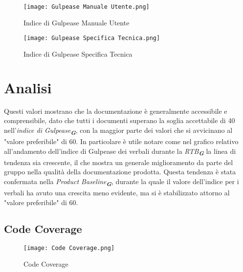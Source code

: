 \begin{figure}[H]
    \centering

    \begin{minipage}{.4\textwidth}
        \centering
        \texttt{[image: Gulpease Manuale Utente.png]}
        \caption{Indice di Gulpease Manuale Utente}
        \label{fig:Gulpease Manuale Utente}
    \end{minipage}%
    \hfill
    \begin{minipage}{.4\textwidth}
        \centering
        \texttt{[image: Gulpease Specifica Tecnica.png]}
        \caption{Indice di Gulpease Specifica Tecnica}
        \label{fig:Gulpease Specifica Tecnica}
    \end{minipage}

\end{figure}


\newpage

\section*{Analisi}

Questi valori mostrano che la documentazione è generalmente accessibile e comprensibile, 
dato che tutti i documenti superano la soglia accettabile di 40 nell'\emph{indice di Gulpease}\textsubscript{\textbf{\textit{G}}}, 
con la maggior parte dei valori che si avvicinano al "valore preferibile" di 60. 
In particolare è utile notare come nel grafico relativo all'andamento dell'indice di Gulpease dei verbali durante la \emph{RTB}\textsubscript{\textbf{\textit{G}}} la linea di tendenza sia crescente,
il che mostra un generale miglioramento da parte del gruppo nella qualità della documentazione prodotta.
Questa tendenza è stata confermata nella \emph{Product Baseline}\textsubscript{\textbf{\textit{G}}},
durante la quale il valore dell'indice per i verbali ha avuto una crescita meno evidente, ma si è stabilizzato attorno al "valore preferibile" di 60.

\newpage

\subsection{Code Coverage}
\label{subsec:Code Coverage}

\begin{figure}[h] 
    \centering
    \texttt{[image: Code Coverage.png]}
    \caption{Code Coverage} 
    \label{fig: Code Coverage}
\end{figure}

